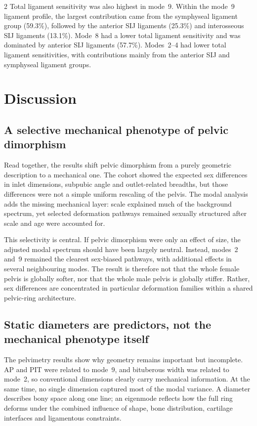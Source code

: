 \documentclass[openacc]{rsproca_new}
\begin{document}
\begin{multicols}{2}
Total ligament sensitivity was also highest in mode~9. Within the mode~9 ligament profile, the largest contribution came from the symphyseal ligament group (59.3\%), followed by the anterior SIJ ligaments (25.3\%) and interosseous SIJ ligaments (13.1\%). Mode~8 had a lower total ligament sensitivity and was dominated by anterior SIJ ligaments (57.7\%). Modes~2--4 had lower total ligament sensitivities, with contributions mainly from the anterior SIJ and symphyseal ligament groups.

\section{Discussion}
\subsection{A selective mechanical phenotype of pelvic dimorphism}

Read together, the results shift pelvic dimorphism from a purely geometric description to a mechanical one. The cohort showed the expected sex differences in inlet dimensions, subpubic angle and outlet-related breadths, but those differences were not a simple uniform rescaling of the pelvis. The modal analysis adds the missing mechanical layer: scale explained much of the background spectrum, yet selected deformation pathways remained sexually structured after scale and age were accounted for.

This selectivity is central. If pelvic dimorphism were only an effect of size, the adjusted modal spectrum should have been largely neutral. Instead, modes~2 and~9 remained the clearest sex-biased pathways, with additional effects in several neighbouring modes. The result is therefore not that the whole female pelvis is globally softer, nor that the whole male pelvis is globally stiffer. Rather, sex differences are concentrated in particular deformation families within a shared pelvic-ring architecture.

\subsection{Static diameters are predictors, not the mechanical phenotype itself}

The pelvimetry results show why geometry remains important but incomplete. AP and PIT were related to mode~9, and bituberous width was related to mode~2, so conventional dimensions clearly carry mechanical information. At the same time, no single dimension captured most of the modal variance. A diameter describes bony space along one line; an eigenmode reflects how the full ring deforms under the combined influence of shape, bone distribution, cartilage interfaces and ligamentous constraints.


\end{multicols}
\end{document}
